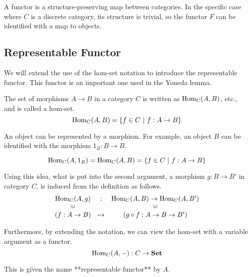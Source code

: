 \documentclass[uplatex,a4j,12pt,dvipdfmx]{jsarticle}
\begin{document}
A functor is a structure-preserving map between categories.
In the specific case where $C$ is a discrete category, its structure is trivial, so the functor $F$ can be identified with a map to objects.

\subsection{Representable Functor}

We will extend the use of the hom-set notation to introduce the representable functor.
This functor is an important one used in the Yoneda lemma.

The set of morphisms $A \to B$ in a category $C$ is written as ${\rm Hom}_{C}(A,B)$, etc., and is called a hom-set.
$${\rm Hom}_{C}(A,B) = \{ f \in C \ | \ f : A \to B\}$$

An object can be represented by a morphism.
For example, an object $B$ can be identified with the morphism $1_{B}: B \to B$.

\[
	{\rm Hom}_{C}(A,1_{B}) = {\rm Hom}_{C}(A,B) = \{ f \in C \ | \ f : A \to B\}
\]

Using this idea, what is put into the second argument, a morphism
$g : B \to B'$
in category $C$, is induced from the definition as follows.
\[
	\begin{array}{ccc}
		{\rm Hom}_{C}(A,g)     & :       & {\rm Hom}_{C}(A,B) \to {\rm Hom}_{C}(A,B') \\
		\rotatebox{90}{${\in}$} &         & \rotatebox{90}{${\in}$}                    \\
		(f : A \to B)           & \mapsto & (g \circ f : A \to B \to B')
	\end{array}
\]

Furthermore, by extending the notation, we can view the hom-set with a variable argument as a functor.
\[
	{\rm Hom}_{C}(A,-) : C \to \mathbf{Set}
\]

This is given the name **representable functor** by $A$.
\end{document}
